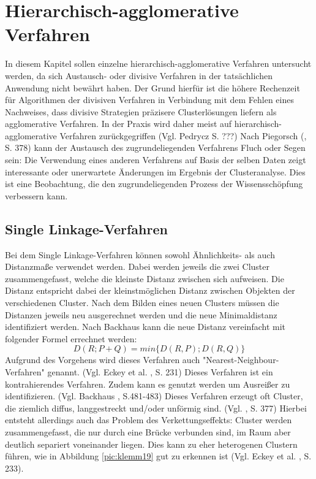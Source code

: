 \chapter{Hierarchisch-agglomerative Verfahren}

In diesem Kapitel sollen einzelne hierarchisch-agglomerative Verfahren untersucht werden, da sich Austausch- oder divisive Verfahren in der tatsächlichen Anwendung nicht bewährt haben. Der Grund hierfür ist die höhere Rechenzeit für Algorithmen der divisiven Verfahren in Verbindung mit dem Fehlen eines Nachweises, dass divisive Strategien präzisere Clusterlösungen liefern als agglomerative Verfahren. In der Praxis wird daher meist auf hierarchisch-agglomerative Verfahren zurückgegriffen (Vgl. Pedrycz \cite{Pedrycz.2010} S. ???)
Nach Piegorsch (\cite{Piegorsch.2015}, S. 378) kann der Austausch des zugrundeliegenden Verfahrens Fluch oder Segen sein: Die Verwendung eines anderen Verfahrens auf Basis der selben Daten zeigt interessante oder unerwartete Änderungen im Ergebnis der Clusteranalyse. Dies ist eine Beobachtung, die den zugrundeliegenden Prozess der Wissensschöpfung verbessern kann.

\section{Single Linkage-Verfahren}
Bei dem Single Linkage-Verfahren können sowohl Ähnlichkeits- als auch Distanzmaße verwendet werden. Dabei werden jeweils die zwei Cluster zusammengefasst, welche die kleinste Distanz zwischen sich aufweisen. Die Distanz entspricht dabei der kleinstmöglichen Distanz zwischen Objekten der verschiedenen Cluster. Nach dem Bilden eines neuen Clusters müssen die Distanzen jeweils neu ausgerechnet werden und die neue Minimaldistanz identifiziert werden.
Nach Backhaus \cite{Backhaus.2016} kann die neue Distanz vereinfacht mit folgender Formel errechnet werden:
\begin{equation}
	D(R;P+Q) = min\{D(R,P);D(R,Q)\}
\end{equation}
Aufgrund des Vorgehens wird dieses Verfahren auch "Nearest-Neighbour-Verfahren" genannt. (Vgl. Eckey et al. \cite{Eckey.2002}, S. 231)
Dieses Verfahren ist ein kontrahierendes Verfahren. Zudem kann es genutzt werden um Ausreißer zu identifizieren. (Vgl. Backhaus \cite{Backhaus.2016}, S.481-483)
Dieses Verfahren erzeugt oft Cluster, die ziemlich diffus, langgestreckt und/oder unförmig sind. (Vgl. \cite{Piegorsch.2015}, S. 377)
Hierbei entsteht allerdings auch das Problem des Verkettungseffekts: Cluster werden zusammengefasst, die nur durch eine Brücke verbunden sind, im Raum aber deutlich separiert voneinander liegen. Dies kann zu eher heterogenen Clustern führen, wie in Abbildung \ref{pic:klemm19} gut zu erkennen ist (Vgl. Eckey et al. \cite{Eckey.2002}, S. 233). 

